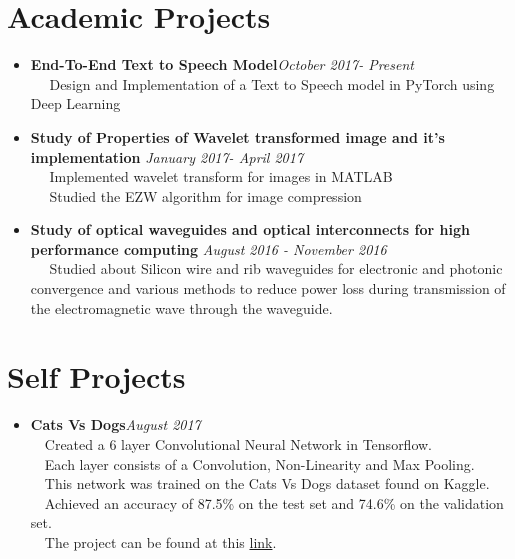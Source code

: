 \documentclass[margin, centered]{res}
\begin{document}
\begin{resume}
\section{\textbf{Academic Projects}}
\begin{itemize}
\item \textbf{End-To-End Text to Speech Model}\hfill\textit{October 2017- Present}\\
~\textbullet~ Design and Implementation of a Text to Speech model in PyTorch using Deep Learning

\item \textbf{Study of Properties of Wavelet transformed image and it's implementation} \hfill\textit{January 2017- April 2017}\\
~\textbullet~ Implemented wavelet transform for images in MATLAB\\
~\textbullet~ Studied the EZW algorithm for image compression 

\item \textbf{Study of optical waveguides and optical interconnects for high performance computing} \hfill\textit{August 2016 - November 2016}\\
~\textbullet~ Studied about Silicon wire and rib waveguides for electronic and photonic convergence and various methods to reduce power loss during transmission of the electromagnetic wave through the waveguide.\\
\end{itemize}

\section{\textbf{Self Projects}}
\begin{itemize}
\item \textbf{Cats Vs Dogs}\hfill\textit{August 2017}\\
~\textbullet~Created a 6 layer Convolutional Neural Network in Tensorflow.\\
~\textbullet~Each layer consists of a Convolution, Non-Linearity and Max Pooling.\\
~\textbullet~This network was trained on the Cats Vs Dogs dataset found on Kaggle.\\
~\textbullet~Achieved an accuracy of 87.5\% on the test set and 74.6\% on the validation set.\\
~\textbullet~The project can be found at this \href{https://github.com/harshanavkis/Dogs-Vs-Cats}{link}.\\
\end{itemize}


\end{resume}
\end{document}

